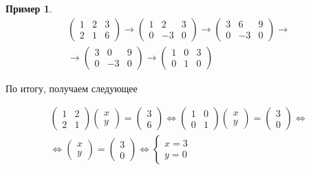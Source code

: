 \documentclass[]{article}
\theoremstyle{theorem}
\theoremstyle{definition}
\newtheorem{ex}{Пример}
\begin{document}
\begin{ex}
\begin{gather*}
	\left(
	\begin{array}{ll|l}
		1 & 2 & 3
		\\
		2 & 1 & 6
	\end{array}
	\right)
	\rightarrow
	\left(
\begin{array}{ll|l}
	1 & 2 & 3
	\\
	0 & -3 & 0
\end{array}
\right)
\rightarrow
	\left(
\begin{array}{ll|l}
	3 & 6 & 9
	\\
	0 & -3 & 0
\end{array}
\right)
\rightarrow
\\
\rightarrow
\left(
\begin{array}{ll|l}
	3 & 0 & 9
	\\
	0 & -3 & 0
\end{array}
\right)
\rightarrow
\left(
\begin{array}{ll|l}
	1 & 0 & 3
	\\
	0 & 1 & 0
\end{array}
\right)
\end{gather*}

По итогу, получаем следующее

\begin{gather*}
\begin{pmatrix}
		1 & 2
		\\
		2 & 1
\end{pmatrix}
\begin{pmatrix}
	x
	\\
	y 
\end{pmatrix}
=
\begin{pmatrix}
	3
	\\
	6 
\end{pmatrix}
\Leftrightarrow
\begin{pmatrix}
	1 & 0 
	\\
	0 & 1 
\end{pmatrix}
\begin{pmatrix}
	x
	\\
	y 
\end{pmatrix}
=
\begin{pmatrix}
	3
	\\
	0 
\end{pmatrix}
\Leftrightarrow
\\
\Leftrightarrow
\begin{pmatrix}
	x
	\\
	y 
\end{pmatrix}
=
\begin{pmatrix}
	3
	\\
	0 
\end{pmatrix}
\Leftrightarrow
\begin{cases}
	x=3
	\\
	y=0
\end{cases}
\end{gather*}
\end{ex}
\end{document}
